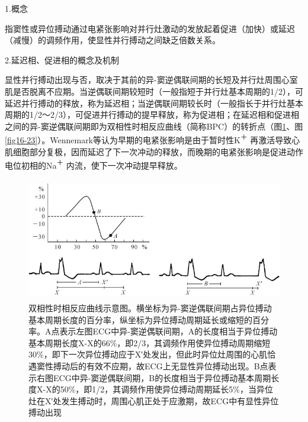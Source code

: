 1.概念

指窦性或异位搏动通过电紧张影响对并行灶激动的发放起着促进（加快）或延迟（减慢）的调频作用，使显性并行搏动之间缺乏倍数关系。

2.延迟相、促进相的概念及机制

显性并行搏动出现与否，取决于其前的异-窦逆偶联间期的长短及并行灶周围心室肌是否脱离不应期。当逆偶联间期较短时（一般指短于并行灶基本周期的1/2），可延迟并行搏动的释放，称为延迟相；当逆偶联间期较长时（一般指长于并行灶基本周期的1/2～2/3），可促进并行搏动的提早释放，称为促进相；在延迟相和促进相之间的异-窦逆偶联间期即为双相性时相反应曲线（简称BPC）的转折点（图\ref{fig16-22}、图\ref{fig16-23}）。Wennemark等认为早期的电紧张影响是由于暂时性K\textsuperscript{＋}
再激活导致心肌细胞部分复极，因而延迟了下一次冲动的释放，而晚期的电紧张影响是促进动作电位初相的Na\textsuperscript{＋}
内流，使下一次冲动提早释放。

\begin{figure}[!htbp]
 \centering
 \includegraphics[width=4.73958in,height=2.11458in]{./images/Image00298.jpg}
 \captionsetup{justification=centering}
 \caption{双相性时相反应曲线示意图。横坐标为异-窦逆偶联间期占异位搏动基本周期长度的百分率，纵坐标为异位搏动周期延长或缩短的百分率。A点表示左图ECG中异-窦逆偶联间期，A的长度相当于异位搏动基本周期长度X-X的66\%，即2/3，其调频作用使异位搏动周期缩短30\%，即下一次异位搏动应于X′处发出，但此时异位灶周围的心肌恰遇窦性搏动后的有效不应期，故ECG上无显性异位搏动出现。B点表示右图ECG中异-窦逆偶联间期，B的长度相当于异位搏动基本周期长度X-X的50\%，即1/2，其调频作用使异位搏动周期延长5\%，当异位灶在X′处发生搏动时，周围心肌正处于应激期，故ECG中有显性异位搏动出现}
 \label{fig16-22}
  \end{figure} 

